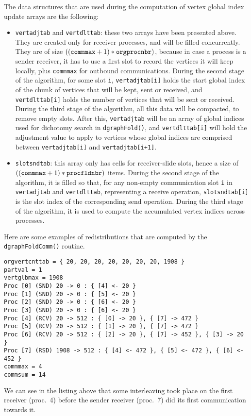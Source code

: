 The data structures that are used during the computation of
vertex global index update arrays are the following:
\begin{itemize}
\item
\texttt{vertadjtab} and \texttt{vertdlttab}: these two arrays have
been presented above. They are created only for receiver processes,
and will be filled concurrently. They are of size
$((\mbox{\texttt{commmax}} + 1) * \mbox{\texttt{orgprocnbr}})$,
because in case a process is a sender receiver, it has to use a first
slot to record the vertices it will keep locally, plus
\texttt{commmax} for outbound communications.
During the second stage of the algorithm, for some slot \texttt{i},
\texttt{vertadjtab[i]} holds the start global index of the
chunk of vertices that will be kept, sent or received, and
\texttt{vertdlttab[i]} holds the number of vertices that
will be sent or received.
During the third stage of the algorithm, all this data will be
compacted, to remove empty slots. After this, \texttt{vertadjtab} will
be an array of global indices used for dichotomy search in
\texttt{dgraph\lbt Fold()}, and \texttt{vertdlttab[i]} will hold
the adjustment value to apply to vertices whose global indices are
comprised between \texttt{vertadjtab[i]} and \texttt{vertadjtab[i+1]}.
\item
\texttt{slotsndtab}: this array only has cells for receiver-slide
slots, hence a size of $((\mbox{\texttt{commmax}} + 1) *
\mbox{\texttt{procfldnbr}})$ items. During the second stage of the
algorithm, it is filled so that, for any non-empty communication slot
\texttt{i} in \texttt{vertadjtab} and \texttt{vertdlttab},
representing a receive operation, \texttt{slotsndtab[i]} is the slot
index of the corresponding send operation. During the third stage of
the algorithm, it is used to compute the accumulated vertex indices
across processes.
\end{itemize}

Here are some examples of redistributions that are computed by the
\texttt{dgraph\lbt Fold\lbt Comm()} routine.

\begin{lstlisting}
orgvertcnttab = { 20, 20, 20, 20, 20, 20, 20, 1908 }
partval = 1
vertglbmax = 1908
Proc [0] (SND) 20 -> 0 : { [4] <- 20 }
Proc [1] (SND) 20 -> 0 : { [5] <- 20 }
Proc [2] (SND) 20 -> 0 : { [6] <- 20 }
Proc [3] (SND) 20 -> 0 : { [6] <- 20 }
Proc [4] (RCV) 20 -> 512 : { [0] -> 20 }, { [7] -> 472 }
Proc [5] (RCV) 20 -> 512 : { [1] -> 20 }, { [7] -> 472 }
Proc [6] (RCV) 20 -> 512 : { [2] -> 20 }, { [7] -> 452 }, { [3] -> 20 }
Proc [7] (RSD) 1908 -> 512 : { [4] <- 472 }, { [5] <- 472 }, { [6] <- 452 }
commmax = 4
commsum = 14
\end{lstlisting}
We can see in the listing above that some interleaving took place
on the first receiver (proc.~4) before the sender receiver (proc.~7)
did its first communication towards it.

